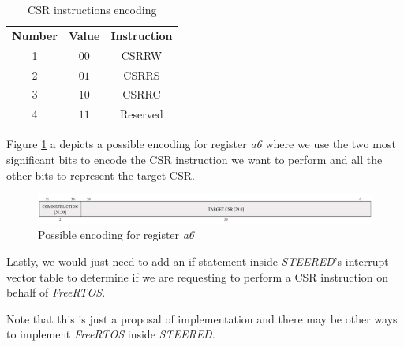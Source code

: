\begin{table}
  \centering
  \begin{tabular}{|c|c|c|}
    \hline
    \textbf{Number} & \textbf{Value} & \textbf{Instruction} \\
    \hhline{===} 1  & $00$           & CSRRW                \\
    \hline
    2               & $01$           & CSRRS                \\
    \hline
    3               & $10$           & CSRRC                \\
    \hline
    4               & $11$           & Reserved             \\
    \hline
  \end{tabular}
  \caption{CSR instructions encoding}
  \label{tab:instructionenc}
\end{table}

Figure \ref{fig:a6encoding} a depicts a possible encoding for register \textit{a6}
where we use the two most significant bits to encode the CSR instruction we want
to perform and all the other bits to represent the target CSR.

\begin{figure}[htbp]
  \centering
  \includegraphics[width=.9\linewidth]{images/freertos_encoding.png}
  \caption{Possible encoding for register \textit{a6}}
  \label{fig:a6encoding}
\end{figure}

Lastly, we would just need to add an if statement inside \textit{STEERED}'s
interrupt vector table to determine if we are requesting to perform a CSR
instruction on behalf of \textit{FreeRTOS}.

Note that this is just a proposal of implementation and there may be other ways to
implement \textit{FreeRTOS} inside \textit{STEERED}.